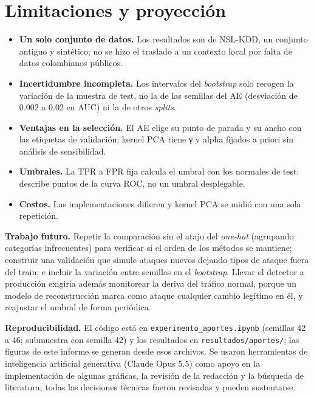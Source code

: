 \documentclass[
  11pt,
]{article}
\providecommand{\tightlist}{%
  \setlength{\itemsep}{0pt}\setlength{\parskip}{0pt}}
\begin{document}
\hypertarget{sec:limitaciones}{%
\section{Limitaciones y proyección}\label{sec:limitaciones}}

\begin{itemize}
\tightlist
\item
  \textbf{Un solo conjunto de datos.} Los resultados son de NSL-KDD, un conjunto antiguo y sintético; no se
  hizo el traslado a un contexto local por falta de datos colombianos públicos.
\item
  \textbf{Incertidumbre incompleta.} Los intervalos del \emph{bootstrap} solo recogen la variación de la muestra de
  test, no la de las semillas del AE (desviación de 0.002 a 0.02 en AUC) ni la de otros \emph{splits}.
\item
  \textbf{Ventajas en la selección.} El AE elige su punto de parada y su ancho con las etiquetas de
  validación; kernel PCA tiene γ y alpha fijados a priori sin análisis de sensibilidad.
\item
  \textbf{Umbrales.} La TPR a FPR fija calcula el umbral con los normales de test: describe puntos de la curva
  ROC, no un umbral desplegable.
\item
  \textbf{Costos.} Las implementaciones difieren y kernel PCA se midió con una sola repetición.
\end{itemize}

\textbf{Trabajo futuro.} Repetir la comparación sin el atajo del \emph{one-hot} (agrupando categorías infrecuentes)
para verificar si el orden de los métodos se mantiene; construir una validación que simule ataques
nuevos dejando tipos de ataque fuera del train; e incluir la variación entre semillas en el \emph{bootstrap}.
Llevar el detector a producción exigiría además monitorear la deriva del tráfico normal, porque un
modelo de reconstrucción marca como ataque cualquier cambio legítimo en él, y reajustar el umbral de
forma periódica.

\textbf{Reproducibilidad.} El código está en \texttt{experimento\_aportes.ipynb} (semillas 42 a 46; submuestra con
semilla 42) y los resultados en \texttt{resultados/aportes/}; las figuras de este informe se generan desde esos
archivos. Se usaron herramientas de inteligencia artificial generativa (Claude Opus 5.5) como apoyo en
la implementación de algunas gráficas, la revisión de la redacción y la búsqueda de literatura; todas
las decisiones técnicas fueron revisadas y pueden sustentarse.
\end{document}
